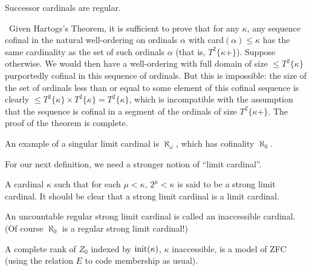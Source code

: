 \finpreuve


\begin{thm}
 Successor cardinals are
 regular.
\end{thm}

\preuve\ Given Hartogs's Theorem, it is sufficient to prove that
for any $\kappa$, any sequence cofinal in the
natural well-ordering on ordinals
$\alpha$ with card$(\alpha) \leq \kappa$ has the same 
cardinality as the set of such ordinals $\alpha$ (that is,
$T^2\{\kappa+\}$).  Suppose otherwise.  We would then have a
well-ordering with full domain of size $\leq
T^2\{\kappa\}$
purportedly cofinal in this sequence of ordinals.  But this is
impossible: the size of the set of ordinals less than or equal to some
element of this cofinal sequence is clearly $\leq T^2\{\kappa\}
\times T^2\{\kappa\}=  T^2\{\kappa\}$, which is incompatible with
the assumption that the sequence is cofinal in a segment of the 
ordinals of size $T^2\{\kappa+\}$.  The proof of the
theorem is complete.
\finpreuve

An example of a singular limit cardinal is
$\aleph_{\omega}$, which has cofinality $\aleph_0$.


For our next definition, we need a stronger notion of ``limit
cardinal''.

\begin{definition}
 A cardinal $\kappa$ such that for each $\mu <
 \kappa$, $2^{\mu} < \kappa$ is said to be a {\upshape strong limit}
 cardinal.  It should be clear that a strong limit cardinal is a
 limit cardinal.
\end{definition}

\begin{definition}
 An uncountable regular strong limit cardinal is
 called an {\upshape inaccessible}
 cardinal.  (Of course $\aleph_0$ is a regular strong limit cardinal!)
\end{definition}

\begin{thm}
 A complete rank of $Z_0$ indexed by $\mathop{\mathrm{init}}(\kappa)$,
 $\kappa$ inaccessible, is a model of ZFC (using the relation 
 $E$ to code membership as usual).
\end{thm}

